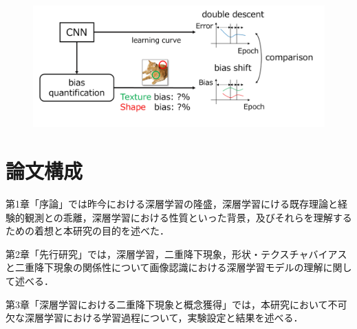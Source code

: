 \begin{figure}[t]
\centering
\includegraphics[width=1\columnwidth]{fig/fig1.pdf}
\vspace{-40pt}
\caption[ Flow of the analysis process comparing double descent with the learning process of image features.]{
}
\label{fig:fig2}
\end{figure}

\section{論文構成}
第1章「序論」では昨今における深層学習の隆盛，深層学習にける既存理論と経験的観測との乖離，深層学習における性質といった背景，及びそれらを理解するための着想と本研究の目的を述べた．\par
第2章「先行研究」では，深層学習，二重降下現象，形状・テクスチャバイアスと二重降下現象の関係性について画像認識における深層学習モデルの理解に関して述べる．\par
第3章「深層学習における二重降下現象と概念獲得」では，本研究において不可欠な深層学習における学習過程について，実験設定と結果を述べる．\par
\newpage